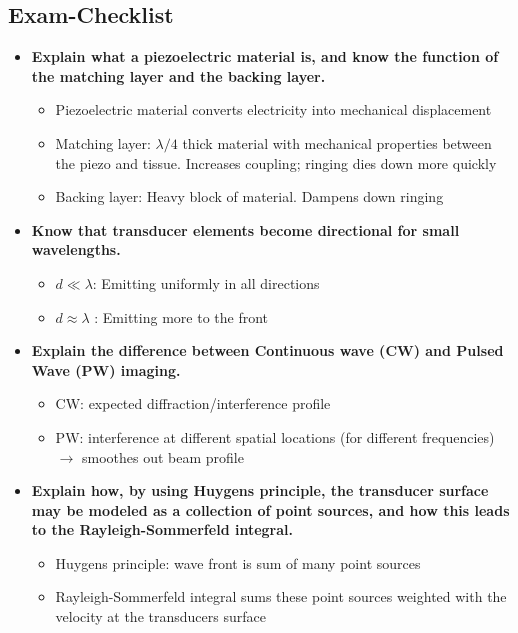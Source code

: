 \documentclass[10pt,a4paper,noendnumber=true]{scrartcl}
\begin{document}
\subsection{Exam-Checklist}
\begin{itemize}
\item \textbf{Explain what a piezoelectric material is, and know the function of the matching layer and the backing layer.}
\begin{itemize}
\item Piezoelectric material converts electricity into mechanical displacement
\item Matching layer: $\lambda/4$ thick material with mechanical properties between the piezo and tissue. Increases coupling; ringing dies down more quickly
\item Backing layer: Heavy block of material. Dampens down ringing
\end{itemize}


\item \textbf{Know that transducer elements become directional for small wavelengths.}
\begin{itemize}
\item $d \ll \lambda$: Emitting uniformly in all directions
\item $d \approx \lambda$ : Emitting more to the front
\end{itemize}

\item \textbf{Explain the difference between Continuous wave (CW) and Pulsed Wave (PW) imaging.}
\begin{itemize}
\item CW: expected diffraction/interference profile
\item PW: interference at different spatial locations (for different frequencies) $\rightarrow$ smoothes out beam profile
\end{itemize}


\item \textbf{Explain how, by using Huygens principle, the transducer surface may be modeled as a collection of point sources, and how this leads to the Rayleigh-Sommerfeld integral.}
\begin{itemize}
\item Huygens principle: wave front is sum of many point sources
\item Rayleigh-Sommerfeld integral sums these point sources weighted with the velocity at the transducers surface
\end{itemize}



\end{itemize}
\end{document}
